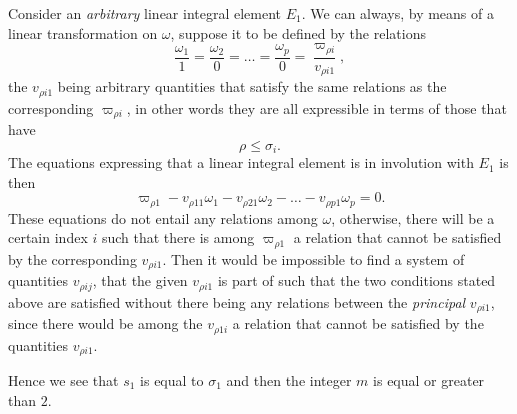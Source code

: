 \documentclass[leqno,11pt]{book}
\theoremstyle{shape1}
\theoremstyle{shapesmall}
\newcommand{\vp}{\varpi}
\begin{document}
Consider an \emph{arbitrary} linear integral element $E_{1}$. We can always, by means of a linear transformation on $\omega$, suppose it to be defined by the relations
\[
\frac{\omega_{1}}{1}=\frac{\omega_{2}}{0}=\dots=\frac{\omega_{p}}{0}=\frac{\vp_{\rho i}}{v_{\rho i1}},
\]
the $v_{\rho i1}$ being arbitrary quantities that satisfy the same relations as the corresponding $\vp_{\rho i}$, in other words they are all expressible in terms of those that have
\[
\rho\le \sigma_{i}.
\]
The equations expressing that a linear integral element is in involution with $E_{1}$ is then
\begin{equation}
  \label{eq:p20}
  \vp_{\rho 1}-v_{\rho 11}\omega_{1}-v_{\rho 21}\omega_{2}-\dots-v_{\rho p1}\omega_{p}=0.
\end{equation}
These equations do not entail any relations among $\omega$, otherwise, there will be a certain index $i$ such that there is among $\vp_{\rho 1}$ a relation that cannot be satisfied by the corresponding $v_{\rho i1}$. Then it would be impossible to find a system of quantities $v_{\rho ij}$, that the given $v_{\rho i1}$ is part of such that the two conditions stated above are satisfied without there being any relations between the \emph{principal} $v_{\rho i1}$, since there would be among the $v_{\rho 1i}$ a relation that cannot be satisfied by the quantities $v_{\rho i1}$.

Hence we see that $s_{1}$ is equal to $\sigma_{1}$ and then the integer $m$ is equal or greater than $2$.
\end{document}
